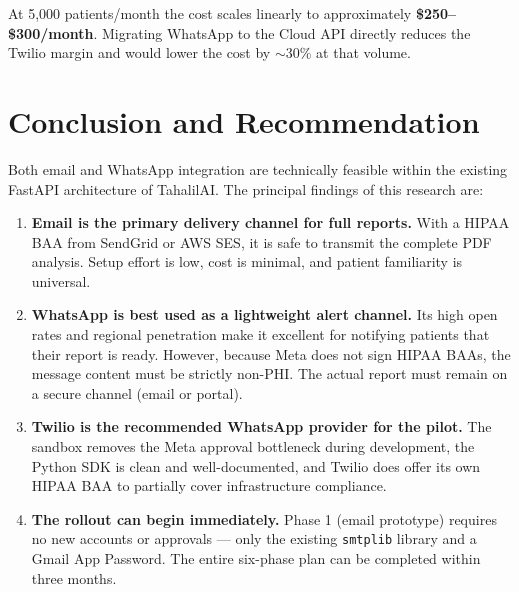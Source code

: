 \documentclass[12pt,a4paper]{article}
\newcommand{\codeinline}[1]{\texttt{\small\color{accent}#1}}
\begin{document}
At 5,000 patients/month the cost scales linearly to approximately
\textbf{\$250--\$300/month}. Migrating WhatsApp to the Cloud API directly
reduces the Twilio margin and would lower the cost by $\sim$30\% at that
volume.

\section{Conclusion and Recommendation}

Both email and WhatsApp integration are technically feasible within the
existing FastAPI architecture of TahalilAI. The principal findings of this
research are:

\begin{enumerate}[leftmargin=2em, itemsep=4pt]
    \item \textbf{Email is the primary delivery channel for full reports.}
          With a HIPAA BAA from SendGrid or AWS SES, it is safe to transmit
          the complete PDF analysis. Setup effort is low, cost is minimal,
          and patient familiarity is universal.

    \item \textbf{WhatsApp is best used as a lightweight alert channel.}
          Its high open rates and regional penetration make it excellent
          for notifying patients that their report is ready. However,
          because Meta does not sign HIPAA BAAs, the message content must
          be strictly non-PHI. The actual report must remain on a secure
          channel (email or portal).

    \item \textbf{Twilio is the recommended WhatsApp provider for the pilot.}
          The sandbox removes the Meta approval bottleneck during
          development, the Python SDK is clean and well-documented, and
          Twilio does offer its own HIPAA BAA to partially cover
          infrastructure compliance.

    \item \textbf{The rollout can begin immediately.} Phase 1 (email
          prototype) requires no new accounts or approvals --- only the
          existing \codeinline{smtplib} library and a Gmail App Password.
          The entire six-phase plan can be completed within three months.
\end{enumerate}
\end{document}

